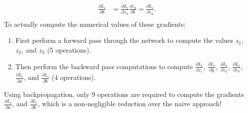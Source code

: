 \begin{example}
\begin{equation*}
\begin{split}
\frac{\partial L_i}{\partial b} &= \frac{\partial L_i}{\partial z_3}\frac{\partial z_3}{\partial b} = \frac{\partial L_i}{\partial z_3}. \\
\end{split}
\end{equation*}
To actually compute the numerical values of these gradients:
\begin{enumerate}
    \item First perform a forward pass through the network to compute the values $z_1$, $z_2$, and $z_3$ (5 operations).
    \item Then perform the backward pass computations to compute $\frac{\partial L_i}{\partial z_1}$, $\frac{\partial L_i}{\partial \hat{y}}$, $\frac{\partial L_i}{\partial z_2}$, $\frac{\partial L_i}{\partial z_3}$, $\frac{\partial L_i}{\partial a}$, and $\frac{\partial L_i}{\partial b}$ (4 operations).
\end{enumerate}
Using backpropagation, only 9 operations are required to compute the gradients $\frac{\partial L_i}{\partial a}$, and $\frac{\partial L_i}{\partial b}$, which is a non-negligible reduction over the naive approach!



\end{example}